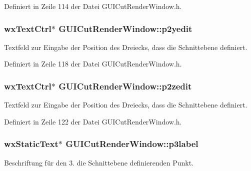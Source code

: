 Definiert in Zeile 114 der Datei G\-U\-I\-Cut\-Render\-Window.\-h.

\hypertarget{classGUICutRenderWindow_a8ec4550ec7d30a8ad3c4c1e5dfcb8dce}{
\subsubsection[{p2yedit}]{\setlength{\rightskip}{0pt plus 5cm}wx\-Text\-Ctrl$\ast$ G\-U\-I\-Cut\-Render\-Window\-::p2yedit\hspace{0.3cm}{\ttfamily [private]}}}\label{classGUICutRenderWindow_a8ec4550ec7d30a8ad3c4c1e5dfcb8dce}
Textfeld zur Eingabe der Position des Dreiecks, dass die Schnittebene definiert. 

Definiert in Zeile 118 der Datei G\-U\-I\-Cut\-Render\-Window.\-h.

\hypertarget{classGUICutRenderWindow_affad4d5ff6cf42dd585a1a5f0e050075}{
\subsubsection[{p2zedit}]{\setlength{\rightskip}{0pt plus 5cm}wx\-Text\-Ctrl$\ast$ G\-U\-I\-Cut\-Render\-Window\-::p2zedit\hspace{0.3cm}{\ttfamily [private]}}}\label{classGUICutRenderWindow_affad4d5ff6cf42dd585a1a5f0e050075}
Textfeld zur Eingabe der Position des Dreiecks, dass die Schnittebene definiert. 

Definiert in Zeile 122 der Datei G\-U\-I\-Cut\-Render\-Window.\-h.

\hypertarget{classGUICutRenderWindow_a6d1f742f0a78f84882f543f0cbbd6357}{
\subsubsection[{p3label}]{\setlength{\rightskip}{0pt plus 5cm}wx\-Static\-Text$\ast$ G\-U\-I\-Cut\-Render\-Window\-::p3label\hspace{0.3cm}{\ttfamily [private]}}}\label{classGUICutRenderWindow_a6d1f742f0a78f84882f543f0cbbd6357}
Beschriftung für den 3. die Schnittebene definierenden Punkt. 

